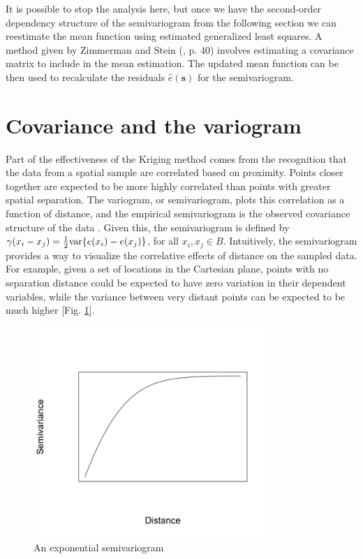 \documentclass[12pt,twoside]{reedthesis}
\begin{document}
It is possible to stop the analysis here, but once we have the second-order dependency structure of the semivariogram from the following section we can reestimate the mean function using estimated generalized least squares. A method given by Zimmerman and Stein (\cite{gelfand:2010}, p. 40) involves estimating a covariance matrix to include in the mean estimation. The updated mean function can be then used to recalculate the residuals $\hat e(\mathbf{s})$ for the semivariogram.


\section{Covariance and the variogram}
Part of the effectiveness of the Kriging method comes from the recognition that the data from a spatial sample are correlated based on proximity. Points closer together are expected to be more highly correlated than points with greater spatial separation. The variogram, or semivariogram, plots this correlation as a function of distance, and the empirical semivariogram is the observed covariance structure of the data \cite{gelfand:2010}. Given this, the semivariogram is defined by $\gamma(x_i - x_j) = {1\over 2} \text{var} \{ e(x_i) - e(x_j) \}$, for all $x_i, x_j \in B$. Intuitively, the semivariogram provides a way to visualize the correlative effects of distance on the sampled data. For example, given a set of locations in the Cartesian plane, points with no separation distance could be expected to have zero variation in their dependent variables, while the variance between very distant points can be expected to be much higher [Fig. \ref{fig:semivariogram}]. 

\begin{figure}[h]
    \centering
    \includegraphics[width=0.8\textwidth]{semivariogram}
    \caption{An exponential semivariogram}
    \label{fig:semivariogram}
\end{figure}
\end{document}
